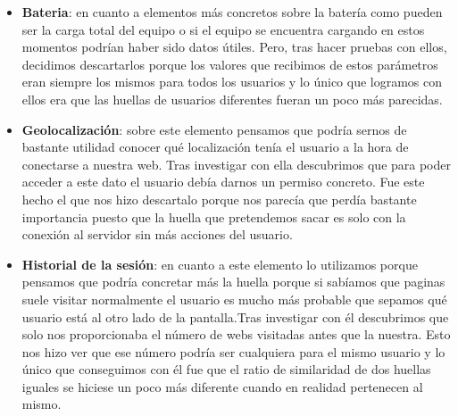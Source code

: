 \begin{itemize}
    \item \textbf{Bateria}: en cuanto a elementos más concretos sobre la batería como pueden ser la carga total del equipo o si el equipo se encuentra cargando en estos momentos podrían haber sido datos útiles. Pero, tras hacer pruebas con ellos, decidimos descartarlos porque los valores que recibimos de estos parámetros eran siempre los mismos para todos los usuarios y lo único que logramos con ellos era que las huellas de usuarios diferentes fueran un poco más parecidas. 
    \item \textbf{Geolocalización}: sobre este elemento pensamos que podría sernos de bastante utilidad conocer qué localización tenía el usuario a la hora de conectarse a nuestra web. Tras investigar con ella descubrimos que para poder acceder a este dato el usuario debía darnos un permiso concreto. Fue este hecho el que nos hizo descartalo porque nos parecía que perdía bastante importancia puesto que la huella que pretendemos sacar es solo con la conexión al servidor sin más acciones del usuario.
    \item \textbf{Historial de la sesión}: en cuanto a este elemento lo utilizamos porque pensamos que podría concretar más la huella porque si sabíamos que paginas suele visitar normalmente el usuario es mucho más probable que sepamos qué usuario está al otro lado de la pantalla.Tras investigar con él descubrimos que solo nos proporcionaba el número de webs visitadas antes que la nuestra. Esto nos hizo ver que ese número podría ser cualquiera para el mismo usuario y lo único que conseguimos con él fue que el ratio de similaridad de dos huellas iguales se hiciese un poco más diferente cuando en realidad pertenecen al mismo.
\end{itemize}